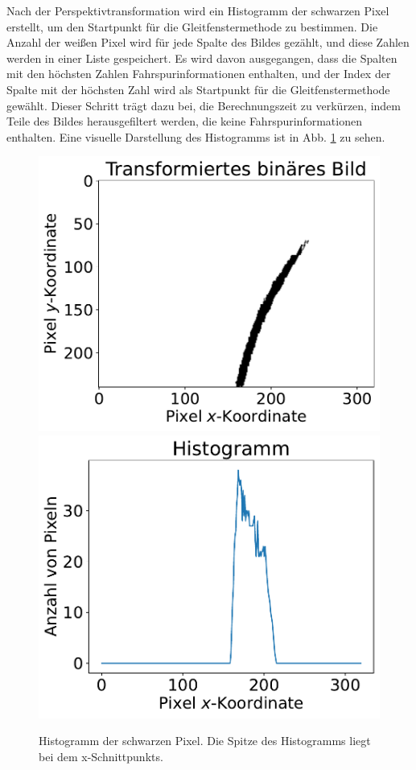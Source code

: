 \documentclass[arbeit=studie,oneside,BCOR=12mm]{ArbeitRST}
\begin{document}
Nach der Perspektivtransformation wird ein Histogramm der schwarzen Pixel erstellt,
um den Startpunkt für die Gleitfenstermethode zu bestimmen. Die Anzahl der
weißen Pixel wird für jede Spalte des Bildes gezählt, und diese Zahlen werden
in einer Liste gespeichert. Es wird davon ausgegangen, dass die Spalten mit den
höchsten Zahlen Fahrspurinformationen enthalten, und der Index der Spalte mit
der höchsten Zahl wird als Startpunkt für die Gleitfenstermethode gewählt.
Dieser Schritt trägt dazu bei, die Berechnungszeit zu verkürzen, indem Teile
des Bildes herausgefiltert werden, die keine Fahrspurinformationen enthalten.
Eine visuelle Darstellung des Histogramms ist in Abb. \ref{hist} zu sehen. \\

\begin{figure}[h]
    \centering
    \includegraphics[scale=0.47]{hist1}
    \includegraphics[scale=0.47]{hist2}
    \caption{Histogramm der schwarzen Pixel. Die Spitze des Histogramms liegt bei dem
    x-Schnittpunkts.}
    \label{hist}
\end{figure}
\end{document}

